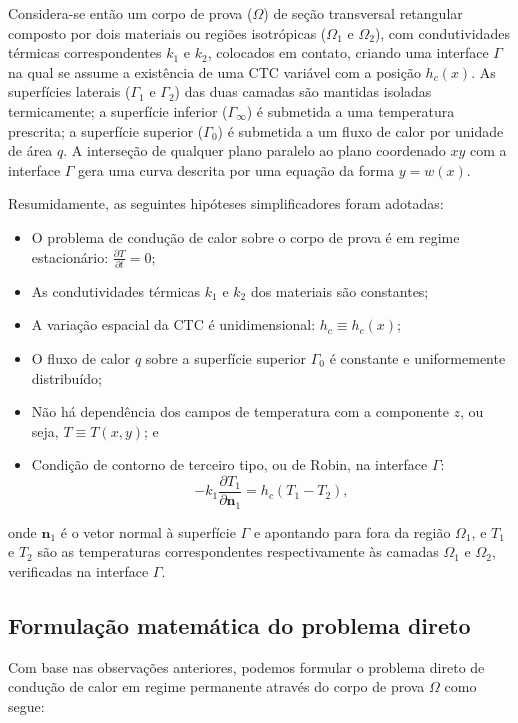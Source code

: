 Considera-se então um corpo de prova ($\Omega$) de seção transversal retangular composto por dois materiais ou regiões isotrópicas ($\Omega_1$ e $\Omega_2$), com
condutividades térmicas correspondentes $k_1$  e $k_2$, colocados em contato,
criando uma interface $\Gamma$ na qual se assume a existência de uma CTC variável com a posição $h_c(x)$.
As superfícies laterais ($\Gamma_1$ e $\Gamma_2$) das duas camadas são mantidas isoladas termicamente;
a superfície inferior ($\Gamma_\infty$) é submetida a uma temperatura prescrita; a superfície superior ($\Gamma_0$) é submetida
a um fluxo de calor por unidade de área $q$. A interseção de qualquer plano paralelo ao plano coordenado $xy$ com a interface $\Gamma$ gera uma
curva descrita por uma equação da forma $y = w(x)$.

Resumidamente, as seguintes hipóteses simplificadores foram adotadas:
\begin{itemize}
  \item O problema de condução de calor sobre o corpo de prova é em regime estacionário: $\displaystyle\frac{\partial T}{\partial t} = 0$;
  \item As condutividades térmicas $k_1$ e $k_2$ dos materiais são constantes;
  \item A variação espacial da CTC é unidimensional: $h_c \equiv h_c(x)$;
  \item O fluxo de calor $q$ sobre a superfície superior $\Gamma_0$ é constante e uniformemente distribuído;
  \item Não há dependência dos campos de temperatura com a componente $z$, ou seja, $T \equiv T(x, y)$; e
  \item Condição de contorno de terceiro tipo, ou de Robin, na interface $\Gamma$:
  		\begin{equation*}
  			-k_1\frac{\partial T_1}{\partial \mathbf{n}_1} = h_c(T_1 - T_2),
  		\end{equation*}   
\end{itemize} 
onde
$\mathbf{n}_1$ é o vetor normal à superfície $\Gamma$ e apontando para fora da região $\Omega_1$, e $T_1$ e $T_2$ são as temperaturas
correspondentes respectivamente às camadas $\Omega_1$ e $\Omega_2$, verificadas na interface $\Gamma$.

\subsection{Formulação matemática do problema direto}\label{sec_formulacao_direta}
Com base nas observações anteriores, podemos formular o problema direto de condução de calor em regime permanente através do corpo de prova $\Omega$ como segue: 

